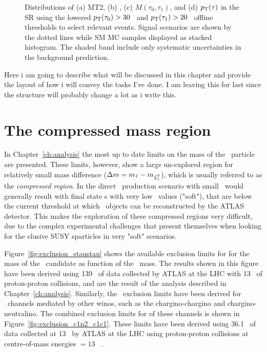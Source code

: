 {\begin{figure}[!hbt]
\begin{center}
\end{center}
\caption{Distributions of (a) MT2, (b) \met, (c) $M(\tau_0,\tau_1)$, and (d) $p_{\mathrm{T}}(\tau)$ in the \ac{SR} using the lowered $p_{\mathrm{T}}(\tau_0)>30$ \gev\ and $p_{\mathrm{T}}(\tau_1)>20$ \gev\  offline thresholds to select relevant events. Signal scenarios are shown by the dotted lines while \ac{SM} \ac{MC} samples displayed as stacked histogram. The shaded band include only systematic uncertainties in the background prediction.}
\label{fig:VBF_C1N2_SR}
\end{figure}
}

Here i am going to describe what will be discussed in this chapter and provide the layout of how i will convey the tasks I've done. I am leaving this for last since the structure will probably change a lot as i write this.

	\section{The compressed mass region}
	\label{sec:compressedmassregion}
	In Chapter~\ref{ch:analysis} the most up to date limits on the mass of the \stau\ particle are presented. 
	These limits, however, show a large un-explored region for relatively small mass difference ($\Delta m = m_{\stau}-m_{\ninoone}$), which is usually referred to as the \textit{compressed region}.
	In the direct \stau\ production scenario with small \dm\ would generally result with final state \ltau s with very low \pt\ values ("soft"), that are below the current threshold at which \ltau\ objects can be reconstructed by the \ac{ATLAS} detector.
	This makes the exploration of these compressed regions very difficult, due to the complex experimental challenges that present themselves when looking for the elusive \ac{SUSY} sparticles in very "soft" scenarios. 
	
	\ExclusionLimits
	 Figure~\ref{fig:exclusion_staustau} shows the available exclusion limits for for the mass of the \ninoone\ candidate as function of the \stau\ mass. The results shown in this figure have been derived using 139 \infb\ of data collected by \ac{ATLAS} at the \ac{LHC} with 13 \tev\ of proton-proton collisions, and are the result of the analysis described in Chapter~\ref{ch:analysis}.
	  Similarly, the \ninoone\ exclusion limits have been derived for \stau\ channels mediated by other winos, such as the chargino-chargino and chargino-neutralino. The combined exclusion limits for of these channels is shown in Figure~\ref{fig:exclusion_c1n2_c1c1}. These limits have been derived using 36.1 \infb\ of data collected at 13 \tev\ by \ac{ATLAS} at the \ac{LHC} using proton-proton collisions at centre-of-mass energies  \com$=13$ \tev~\cite{analysis_c1c1_c1n2}. 
	
